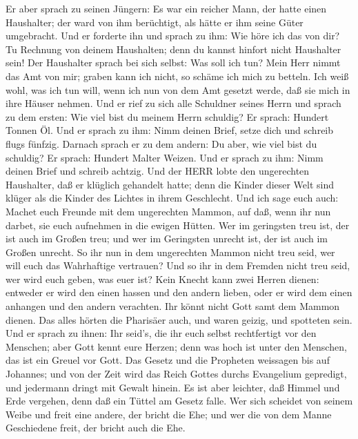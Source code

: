  Er aber sprach zu seinen Jüngern: Es war ein reicher Mann,
der hatte einen Haushalter; der ward von ihm berüchtigt, als hätte er
ihm seine Güter umgebracht.  Und er forderte ihn und sprach
zu ihm: Wie höre ich das von dir? Tu Rechnung von deinem Haushalten;
denn du kannst hinfort nicht Haushalter sein!  Der
Haushalter sprach bei sich selbst: Was soll ich tun? Mein Herr nimmt das
Amt von mir; graben kann ich nicht, so schäme ich mich zu betteln.
 Ich weiß wohl, was ich tun will, wenn ich nun von dem Amt
gesetzt werde, daß sie mich in ihre Häuser nehmen.  Und er
rief zu sich alle Schuldner seines Herrn und sprach zu dem ersten: Wie
viel bist du meinem Herrn schuldig?  Er sprach: Hundert
Tonnen Öl. Und er sprach zu ihm: Nimm deinen Brief, setze dich und
schreib flugs fünfzig.  Darnach sprach er zu dem andern: Du
aber, wie viel bist du schuldig? Er sprach: Hundert Malter Weizen. Und
er sprach zu ihm: Nimm deinen Brief und schreib achtzig. 
Und der HERR lobte den ungerechten Haushalter, daß er klüglich gehandelt
hatte; denn die Kinder dieser Welt sind klüger als die Kinder des
Lichtes in ihrem Geschlecht.  Und ich sage euch auch: Machet
euch Freunde mit dem ungerechten Mammon, auf daß, wenn ihr nun darbet,
sie euch aufnehmen in die ewigen Hütten.  Wer im geringsten
treu ist, der ist auch im Großen treu; und wer im Geringsten unrecht
ist, der ist auch im Großen unrecht.  So ihr nun in dem
ungerechten Mammon nicht treu seid, wer will euch das Wahrhaftige
vertrauen?  Und so ihr in dem Fremden nicht treu seid, wer
wird euch geben, was euer ist?  Kein Knecht kann zwei
Herren dienen: entweder er wird den einen hassen und den andern lieben,
oder er wird dem einen anhangen und den andern verachten. Ihr könnt
nicht Gott samt dem Mammon dienen.  Das alles hörten die
Pharisäer auch, und waren geizig, und spotteten sein.  Und
er sprach zu ihnen: Ihr seid's, die ihr euch selbst rechtfertigt vor den
Menschen; aber Gott kennt eure Herzen; denn was hoch ist unter den
Menschen, das ist ein Greuel vor Gott.  Das Gesetz und die
Propheten weissagen bis auf Johannes; und von der Zeit wird das Reich
Gottes durchs Evangelium gepredigt, und jedermann dringt mit Gewalt
hinein.  Es ist aber leichter, daß Himmel und Erde
vergehen, denn daß ein Tüttel am Gesetz falle.  Wer sich
scheidet von seinem Weibe und freit eine andere, der bricht die Ehe; und
wer die von dem Manne Geschiedene freit, der bricht auch die Ehe.
